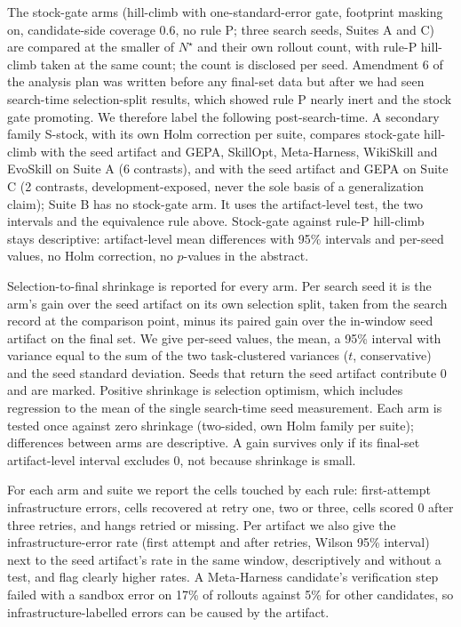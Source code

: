 The stock-gate arms (hill-climb with one-standard-error gate, footprint masking on, candidate-side coverage 0.6, no rule P; three search seeds, Suites A and C) are compared at the smaller of $N^\star$ and their own rollout count, with rule-P hill-climb taken at the same count; the count is disclosed per seed. Amendment 6 of the analysis plan was written before any final-set data but after we had seen search-time selection-split results, which showed rule P nearly inert and the stock gate promoting. We therefore label the following post-search-time. A secondary family S-stock, with its own Holm correction per suite, compares stock-gate hill-climb with the seed artifact and GEPA, SkillOpt, Meta-Harness, WikiSkill and EvoSkill on Suite A (6 contrasts), and with the seed artifact and GEPA on Suite C (2 contrasts, development-exposed, never the sole basis of a generalization claim); Suite B has no stock-gate arm. It uses the artifact-level test, the two intervals and the equivalence rule above. Stock-gate against rule-P hill-climb stays descriptive: artifact-level mean differences with 95\% intervals and per-seed values, no Holm correction, no $p$-values in the abstract.

Selection-to-final shrinkage is reported for every arm. Per search seed it is the arm's gain over the seed artifact on its own selection split, taken from the search record at the comparison point, minus its paired gain over the in-window seed artifact on the final set. We give per-seed values, the mean, a 95\% interval with variance equal to the sum of the two task-clustered variances ($t$, conservative) and the seed standard deviation. Seeds that return the seed artifact contribute 0 and are marked. Positive shrinkage is selection optimism, which includes regression to the mean of the single search-time seed measurement. Each arm is tested once against zero shrinkage (two-sided, own Holm family per suite); differences between arms are descriptive. A gain survives only if its final-set artifact-level interval excludes 0, not because shrinkage is small.

For each arm and suite we report the cells touched by each rule: first-attempt infrastructure errors, cells recovered at retry one, two or three, cells scored 0 after three retries, and hangs retried or missing. Per artifact we also give the infrastructure-error rate (first attempt and after retries, Wilson 95\% interval) next to the seed artifact's rate in the same window, descriptively and without a test, and flag clearly higher rates. A Meta-Harness candidate's verification step failed with a sandbox error on 17\% of rollouts against 5\% for other candidates, so infrastructure-labelled errors can be caused by the artifact.

